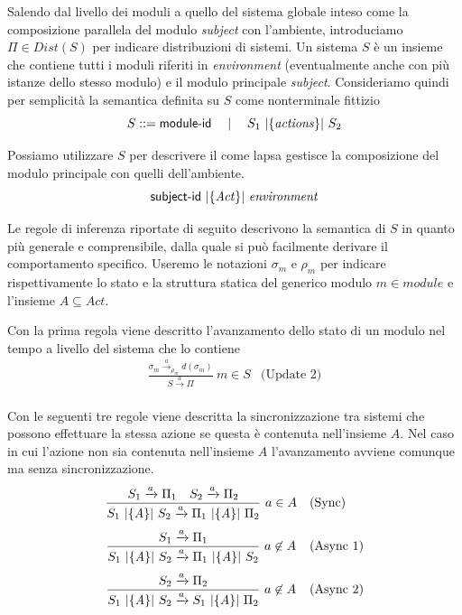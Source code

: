 Salendo dal livello dei moduli a quello del sistema globale inteso come la composizione parallela del modulo \emph{subject} con l'ambiente, introduciamo $\Pi \in Dist(S)$ per indicare distribuzioni di sistemi. Un sistema $S$ è un insieme che contiene tutti i moduli riferiti in \emph{environment} (eventualmente anche con più istanze dello stesso modulo) e il modulo principale \emph{subject}. Consideriamo quindi per semplicità la semantica definita su $S$ come nonterminale fittizio
$$ S ::= {\sf module}\textrm{-}{\sf id} \quad\mid\quad S_1 \mbox{ } |\{\mathit{actions}\}| \mbox{ } S_2 $$

Possiamo utilizzare $S$ per descrivere il come \ac{lapsa} gestisce la composizione del modulo principale con quelli dell'ambiente.
$$ {\sf subject}\textrm{-}{\sf id} \mbox{ } |\{\mathit{Act}\}| \mbox{ } \mathit{environment} $$

Le regole di inferenza riportate di seguito descrivono la semantica di $S$ in quanto più generale e comprensibile, dalla quale si può facilmente derivare il comportamento specifico. Useremo le notazioni $\sigma_m$ e $\rho_m$ per indicare rispettivamente lo stato e la struttura statica del generico modulo $m \in \mathit{module}$ e l'insieme $A \subseteq Act$. 

Con la prima regola viene descritto l'avanzamento dello stato di un modulo nel tempo a livello del sistema che lo contiene
$$
\begin{array}{cl}
	\displaystyle{\frac{\sigma_m \xrightarrow{a}_{\rho_m} d(\sigma_m)}{S \xrightarrow{a} \Pi}\ m \in S} & \mbox{(Update 2)} \\
\end{array}
$$

Con le seguenti tre regole viene descritta la sincronizzazione tra sistemi che possono effettuare la stessa azione se questa è contenuta nell'insieme $A$. Nel caso in cui l'azione non sia contenuta nell'insieme $A$ l'avanzamento avviene comunque ma senza sincronizzazione.
$$
\begin{array}{cl}
	\displaystyle{\frac{S_1 \xrightarrow{a} \Pi_1 \quad S_2 \xrightarrow{a} \Pi_2}{S_1 \mbox{ }|{\{\mathit{A}\}}|\mbox{ }S_2 \xrightarrow{a} \Pi_1 \mbox{ }|{\{\mathit{A}\}}|\mbox{ }\Pi_2}\ a \in A} & \mbox{(Sync)} \\[.5cm]
	\displaystyle{\frac{S_1 \xrightarrow{a} \Pi_1}{S_1 \mbox{ }|{\{\mathit{A}\}}|\mbox{ }S_2 \xrightarrow{a} \Pi_1 \mbox{ }|{\{\mathit{A}\}}|\mbox{ }S_2}\ a \not\in A} & \mbox{(Async\ 1)} \\[.5cm]
	\displaystyle{\frac{S_2 \xrightarrow{a} \Pi_2}{S_1 \mbox{ }|{\{\mathit{A}\}}|\mbox{ }S_2 \xrightarrow{a} S_1 \mbox{ }|{\{\mathit{A}\}}|\mbox{ }\Pi_2}\ a \not\in A} & \mbox{(Async\ 2)} \\
\end{array}
$$

